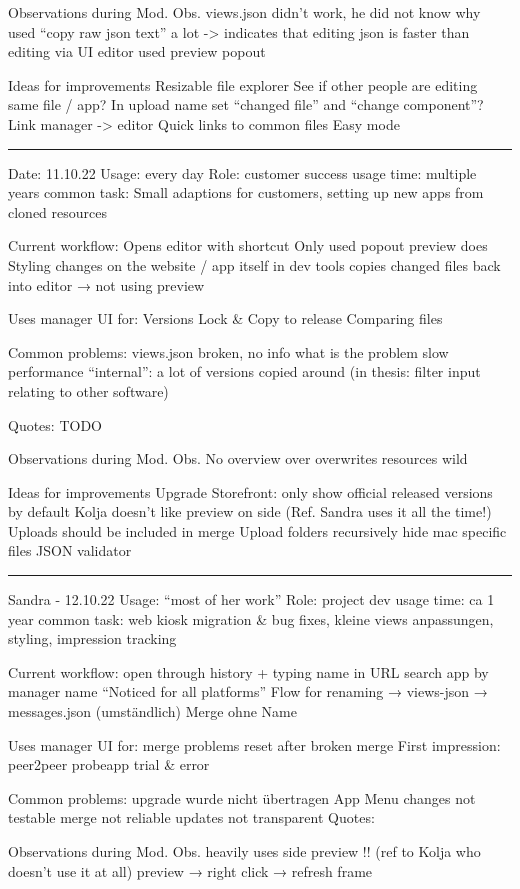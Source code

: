 Observations during Mod. Obs.
views.json didn't work, he did not know why
used “copy raw json text” a lot -> indicates that editing json is faster than editing via UI editor
used preview popout

Ideas for improvements
Resizable file explorer
See if other people are editing same file / app?
In upload name set “changed file” and “change component”?
Link manager -> editor
Quick links to common files
Easy mode

\hrule
Date: 11.10.22
Usage: every day
Role: customer success
usage time: multiple years
common task: Small adaptions for customers, setting up new apps from cloned resources

Current workflow:
Opens editor with shortcut
Only used popout preview
does Styling changes on the website / app itself in dev tools
copies changed files back into editor
→ not using preview

Uses manager UI for:
Versions Lock \& Copy to release
Comparing files

Common problems:
views.json broken, no info what is the problem
slow performance
“internal”: a lot of versions copied around (in thesis: filter input relating to other software)

Quotes:
TODO

Observations during Mod. Obs.
No overview over overwrites
resources wild

Ideas for improvements
Upgrade Storefront: only show official released versions by default
Kolja doesn't like preview on side (Ref. Sandra uses it all the time!)
Uploads should be included in merge
Upload folders recursively
hide mac specific files
JSON validator
\hrule
Sandra - 12.10.22
Usage: “most of her work”
Role: project dev
usage time: ca 1 year
common task: web kiosk migration \& bug fixes, kleine views anpassungen, styling, impression tracking

Current workflow:
open through history + typing name in URL
search app by manager name
“Noticed for all platforms”
Flow for renaming → views-json → messages.json (umständlich)
Merge ohne Name

Uses manager UI for:
merge problems
reset after broken merge
First impression:
peer2peer
probeapp
trial \& error

Common problems:
upgrade wurde nicht übertragen
App Menu changes not testable
merge not reliable
updates not transparent
Quotes:


Observations during Mod. Obs.
heavily uses side preview !! (ref to Kolja who doesn’t use it at all)
preview → right click → refresh frame

